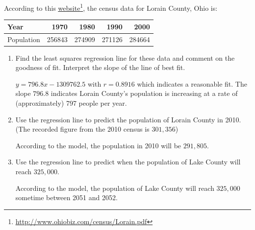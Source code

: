 \documentclass{ximera}
\begin{document}
\begin{problem}
According to this \href{http://www.ohiobiz.com/census/Lorain.pdf}{\underline{website}}\footnote{\href{http://www.ohiobiz.com/census/Lorain.pdf}{\underline{http://www.ohiobiz.com/census/Lorain.pdf}}}, the census data for Lorain County, Ohio is:

\begin{tabular}{|l|r|r|r|r|} \hline
Year & 1970 & 1980 & 1990 & 2000 \\
\hline
Population & 256843 & 274909 & 271126 & 284664 \\ \hline
\end{tabular}

\begin{enumerate}


\item  Find the least squares regression line for these data and comment on the goodness of fit. Interpret the slope of the line of best fit.

\begin{solution}
$y = 796.8x - 1309762.5$ with $r=0.8916$ which indicates a reasonable fit.  The slope $796.8$ indicates Lorain County's population is increasing at a rate of (approximately) 797 people per year.
\end{solution}

\item  Use the regression line to predict the population of Lorain County in 2010.  (The recorded figure from the 2010 census is $301,\!356$)

\begin{solution}
According to the model, the population in 2010 will be $291, \! 805$.
\end{solution}

\item  Use the regression line to predict when the population of Lake County will reach $325,\!000$.

\begin{solution}
According to the model, the population of Lake County will reach $325,\!000$ sometime between 2051 and 2052.
\end{solution}
\end{enumerate}
\end{problem}
\end{document}
